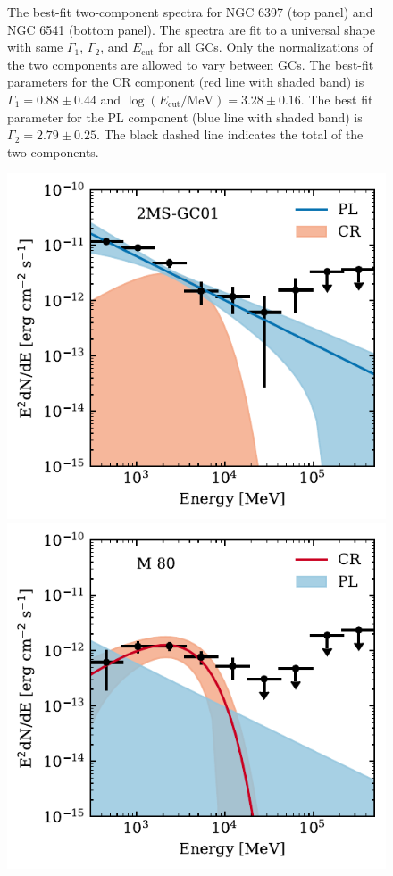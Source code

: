 \documentclass[doublespace,nopageskip]{VTthesis} %
\begin{document}
\begin{figure}
    \caption{The best-fit two-component spectra for NGC 6397 (top panel) and NGC 6541 (bottom panel). The spectra are fit to a universal shape with same $\Gamma_1$, $\Gamma_2$, and $E_\mathrm{cut}$ for all GCs.  Only the normalizations of the two components are allowed to vary between GCs. The best-fit parameters for the CR component (red line with shaded band) is $\Gamma_1 = 0.88 \pm 0.44$ and $\log(E_\mathrm{cut}/\mathrm{MeV})=3.28 \pm 0.16$. The best fit parameter for the {PL} component (blue line with shaded band) is $\Gamma_2 = 2.79 \pm 0.25$. The black dashed line indicates the total of the two components.}
    \label{fig:global_spectra}
\end{figure}

\begin{figure}
    \centering
    \includegraphics[width=1\columnwidth]{Figures/Globular/spectra/2comp_0.pdf}
    \includegraphics[width=1\columnwidth]{Figures/Globular/spectra/2comp_8.pdf}

\end{figure}
\end{document}

